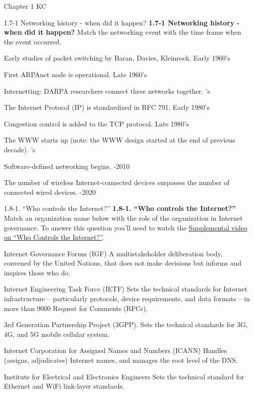 \documentclass[a4paper]{article}
\begin{document}
\begin{quiz}{Chapter 1 KC}
\begin{matching}[points=1]{1.7-1 Networking history - when did it happen?}
\textbf{1.7-1 Networking history - when did it happen?}
Match the networking event with the time frame when the event occurred.
\item Early studies of packet switching by Baran, Davies, Kleinrock. \answer Early 1960's
\item First ARPAnet node is operational. \answer Late 1960's
\item Internetting: DARPA researchers connect three networks together. 's
\item The Internet Protocol (IP) is standardized in RFC 791. \answer Early 1980's
\item Congestion control is added to the TCP protocol. \answer Late 1980's
\item The WWW starts up (note: the WWW design started at the end of previous decade). 's
\item Software-defined networking begins. -2010
\item The number of wireless Internet-connected devices surpasses the number of connected wired devices. -2020
\end{matching}

\begin{matching}[points=1]{1.8-1. ``Who controls the Internet?''}
\textbf{1.8-1. ``Who controls the Internet?''}
Match an organization name below with the role of the organization in Internet governance. 
To answer this question you'll need to watch the \href{https://www.youtube.com/watch?v=xrd4hD_9fS8}{Supplemental video on ``Who Controls the Internet?''}.

\item Internet Governance Forum (IGF) \answer A multistakeholder deliberation body, convened by the United Nations, that does not make decisions but informs and inspires those who do.
\item Internet Engineering Task Force (IETF) \answer Sets the technical standards for Internet infrastructure -- particularly protocols, device requirements, and data formats -- in more than 9000 Request for Comments (RFCs).
\item 3rd Generation Partnership Project (3GPP). \answer Sets the technical standards for 3G, 4G, and 5G mobile cellular system.
\item Internet Corporation for Assigned Names and Numbers (ICANN) \answer Handles (assigns, adjudicates) Internet names, and manages the root level of the DNS.
\item Institute for Electrical and Electronics Engineers \answer Sets the technical standard for Ethernet and WiFi link-layer standards.
\end{matching}


\end{quiz}
\end{document}
